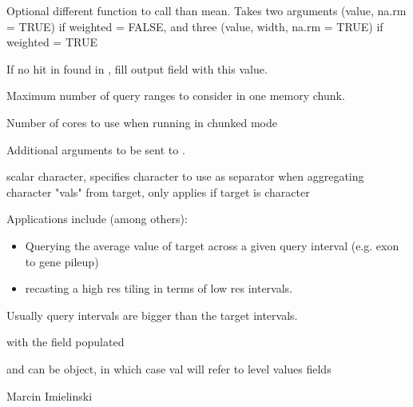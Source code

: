 \documentclass[a4paper]{book}
\begin{document}
\begin{Arguments}
\begin{ldescription}
\item[\code{FUN}] Optional different function to call than mean. Takes two arguments (value, na.rm = TRUE) if weighted = FALSE, and three (value, width, na.rm = TRUE) if weighted = TRUE

\item[\code{default.val}] If no hit in  found in , fill output  field with this value.

\item[\code{max.slice}] Maximum number of query ranges to consider in one memory chunk. \code{[Inf]}

\item[\code{mc.cores}] Number of cores to use when running in chunked mode

\item[\code{...}] Additional arguments to be sent to .

\item[\code{sep}] scalar character, specifies character to use as separator when aggregating character "vals" from target, only applies if target is character
\end{ldescription}
\end{Arguments}
%
\begin{Details}\relax
Applications include (among others):
\begin{itemize}

\item Querying the average value of target across a given query interval (e.g. exon to gene pileup)
\item recasting a high res tiling in terms of low res intervals.

\end{itemize}

Usually query intervals are bigger than the target intervals.
\end{Details}
%
\begin{Value}
 with the  field populated
\end{Value}
%
\begin{Note}\relax
{} and  can be  object, in which case val will refer to  level values fields
\end{Note}
%
\begin{Author}\relax
Marcin Imielinski
\end{Author}
\end{document}
